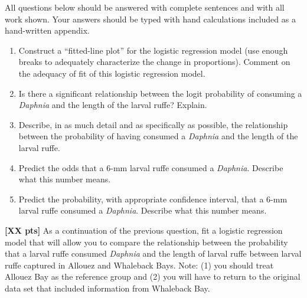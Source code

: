 \documentclass[10pt,openany]{book}\usepackage[]{graphicx}\usepackage[]{color}
\begin{document}
\begin{hwsection}{All questions below should be answered with complete sentences and with all work shown.  Your answers should be typed with hand calculations included as a hand-written appendix.}
    \begin{enumerate}
      \item Construct a ``fitted-line plot'' for the logistic regression model (use enough breaks to adequately characterize the change in proportions).  Comment on the adequacy of fit of this logistic regression model.
      \item Is there a significant relationship between the logit probability of consuming a  \emph{Daphnia} and the length of the larval ruffe?  Explain.
      \item Describe, in as much detail and as specifically as possible, the relationship between the probability of having consumed a \emph{Daphnia} and the length of the larval ruffe.
      \item Predict the odds that a 6-mm larval ruffe consumed a \emph{Daphnia}.  Describe what this number means.
      \item Predict the probability, with appropriate confidence interval, that a 6-mm larval ruffe consumed a \emph{Daphnia}.  Describe what this number means.
    \end{enumerate}

\vspace{18pt}
  \item \label{hwprob:LMlogisticRuffe2} \textbf{[XX pts]}  As a continuation of the previous question, fit a logistic regression model that will allow you to compare the relationship between the probability that a larval ruffe consumed \emph{Daphnia} and the length of larval ruffe between larval ruffe captured in Allouez and Whaleback Bays.  Note: (1) you should treat Allouez Bay as the reference group and (2) you will have to return to the original data set that included information from Whaleback Bay.


\end{hwsection}
\end{document}
